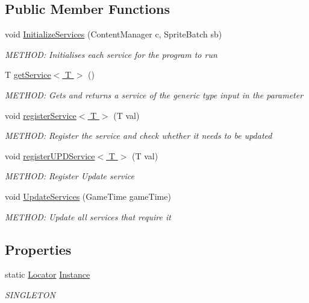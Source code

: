 \subsection*{Public Member Functions}
\begin{DoxyCompactItemize}
\item 
void \hyperlink{a00542_a34bc6f5d735512bae556d2ec65a7bda7}{Initialize\+Services} (Content\+Manager c, Sprite\+Batch sb)
\begin{DoxyCompactList}\small\item\em M\+E\+T\+H\+OD\+: Initialises each service for the program to run \end{DoxyCompactList}\item 
T \hyperlink{a00542_a2bb3c0174bd67904d148bc789c9faaba}{get\+Service$<$ T $>$} ()
\begin{DoxyCompactList}\small\item\em M\+E\+T\+H\+OD\+: Gets and returns a service of the generic type input in the parameter \end{DoxyCompactList}\item 
void \hyperlink{a00542_a2a2ead2e1ed9a2d63b59ab34621b0812}{register\+Service$<$ T $>$} (T val)
\begin{DoxyCompactList}\small\item\em M\+E\+T\+H\+OD\+: Register the service and check whether it needs to be updated \end{DoxyCompactList}\item 
void \hyperlink{a00542_af5c3ce0526940dffc81919b2ef35d652}{register\+U\+P\+D\+Service$<$ T $>$} (T val)
\begin{DoxyCompactList}\small\item\em M\+E\+T\+H\+OD\+: Register Update service \end{DoxyCompactList}\item 
void \hyperlink{a00542_ab66a423db26d79e6fc655df699a64f0c}{Update\+Services} (Game\+Time game\+Time)
\begin{DoxyCompactList}\small\item\em M\+E\+T\+H\+OD\+: Update all services that require it \end{DoxyCompactList}\end{DoxyCompactItemize}
\subsection*{Properties}
\begin{DoxyCompactItemize}
\item 
static \hyperlink{a00542}{Locator} \hyperlink{a00542_ab1da0b54c482b49d1654f9763b161883}{Instance}
\begin{DoxyCompactList}\small\item\em S\+I\+N\+G\+L\+E\+T\+ON \end{DoxyCompactList}\end{DoxyCompactItemize}


